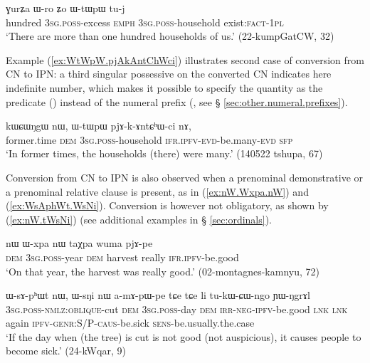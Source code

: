 \begin{exe}
\ex \label{ex:GurZa.Wro.WtWpW}
\gll ɣurʑa ɯ-ro ʑo ɯ-tɯpɯ tu-j \\
 hundred \textsc{3sg}.\textsc{poss}-excess \textsc{emph} \textsc{3sg}.\textsc{poss}-household exist:\textsc{fact}-\textsc{1pl} \\
\glt `There are more than one hundred households of us.' (22-kumpGatCW, 32)
\end{exe}

Example (\ref{ex:WtWpW.pjAkAntChWci}) illustrates second case of conversion from CN to IPN: a third singular possessive on the converted CN indicates here indefinite number, which makes it possible to specify the quantity as the predicate () instead of the numeral prefix (, see § \ref{sec:other.numeral.prefixes}).

\begin{exe}
\ex \label{ex:WtWpW.pjAkAntChWci}
\gll kɯɕɯŋgɯ nɯ, ɯ-tɯpɯ pjɤ-k-ɤntɕʰɯ-ci nɤ, \\
 former.time \textsc{dem} \textsc{3sg}.\textsc{poss}-household \textsc{ifr}.\textsc{ipfv}-\textsc{evd}-be.many-\textsc{evd} \textsc{sfp} \\
\glt `In former times, the households (there) were many.' (140522 tshupa, 67)
\end{exe}

Conversion from CN to IPN is also observed when a prenominal demonstrative or a prenominal relative clause is present, as in (\ref{ex:nW.Wxpa.nW}) and (\ref{ex:WsAphWt.WsNi}). Conversion is however not obligatory, as shown by (\ref{ex:nW.tWsNi}) (see additional examples in § \ref{sec:ordinals}).

\begin{exe}
\ex \label{ex:nW.Wxpa.nW}
\gll nɯ ɯ-xpa nɯ taχpa wuma pjɤ-pe \\
\textsc{dem} \textsc{3sg}.\textsc{poss}-year \textsc{dem} harvest really \textsc{ifr}.\textsc{ipfv}-be.good \\
\glt `On that year, the harvest was really good.' (02-montagnes-kamnyu, 72)
\end{exe}

\begin{exe}
\ex \label{ex:WsAphWt.WsNi}
\gll ɯ-sɤ-pʰɯt nɯ, ɯ-sŋi nɯ a-mɤ-pɯ-pe tɕe tɕe li tu-kɯ-ɕɯ-ngo ɲɯ-ŋgrɤl \\
\textsc{3sg}.\textsc{poss}-\textsc{nmlz}:\textsc{oblique}-cut \textsc{dem} \textsc{3sg}.\textsc{poss}-day \textsc{dem} \textsc{irr}-\textsc{neg}-\textsc{ipfv}-be.good \textsc{lnk} \textsc{lnk} again \textsc{ipfv}-\textsc{genr}:S/P-\textsc{caus}-be.sick \textsc{sens}-be.usually.the.case \\
\glt `If the day when (the tree) is cut is not good (not auspicious), it causes people to become sick.' (24-kWqar, 9)
\end{exe}

